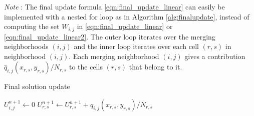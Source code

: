 
\noindent\textit{Note }: The final update formula \eqref{eqn:final_update_linear} can easily be implemented with a 
nested for loop as in Algorithm \ref{alg:finalupdate},  
instead of computing the set $W_{i,j}$ in \eqref{eqn:final_update_linear} or \eqref{eqn:final_update_linear2}.  
The outer loop iterates over the merging neighborhoods $(i,j)$ and the inner loop iterates over each cell $(r,s)$ in neighborhood $(i,j)$.  Each merging neighborhood $(i,j)$ gives a contribution $ \hat{q}_{i,j}(x_{r,s}, y_{r,s})/N_{r,s} $ to the cells $(r,s)$ that belong to it. 
\begin{algorithm}[H]
		\caption{\sf Final solution update} \label{alg:finalupdate}
	\begin{algorithmic}
	\State $U^{n+1}_{i,j} \leftarrow 0$
	\EndFor
			\State $U^{n+1}_{r,s} \leftarrow U^{n+1}_{r,s} + \hat{q}_{i,j}(x_{r,s}, y_{r,s})/N_{r,s} $
		\EndFor
	\EndFor
	\end{algorithmic}
\end{algorithm}



